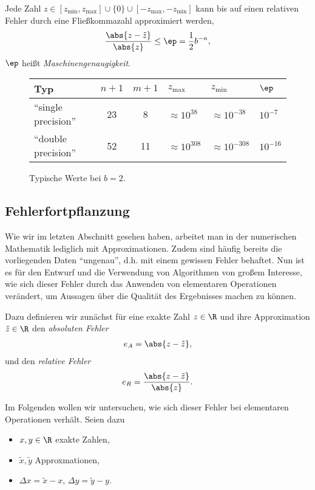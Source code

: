 Jede Zahl $z\in[z_{\text{min}}, z_{\text{max}}]\cup\{0\}\cup[-z_{\text{max}},
-z_{\text{min}}]$ kann bis auf einen relativen Fehler durch eine Fließkommazahl
approximiert werden,
\begin{align*}
\frac{\abs{z-\tilde{z}}}{\abs{z}} \le \ep = \frac{1}{2}b^{-n},
\end{align*}
$\ep$ heißt \emph{Maschinengenaugigkeit}.

\begin{figure}[h]
\begin{tabular}{l|cclll}
\bfseries Typ & $n+1$ & $m+1$ & $z_\text{max}$ & $z_\text{min}$ & $\ep$\\\hline
``single precision'' & 23 & 8 & $\approx 10^{38}$ &  $\approx 10^{-38}$ &
$10^{-7}$\\
``double precision'' & 52 & 11 & $\approx 10^{308}$ &  $\approx 10^{-308}$ &
$10^{-16}$
\end{tabular}
\caption{Typische Werte bei $b=2$.}
\end{figure}

\subsection{Fehlerfortpflanzung}

Wie wir im letzten Abschnitt gesehen haben, arbeitet man in der numerischen
Mathematik lediglich mit Approximationen. Zudem sind häufig bereits die
vorliegenden Daten ``ungenau'', d.h. mit einem gewissen Fehler behaftet. Nun
ist es für den Entwurf und die Verwendung von Algorithmen von großem Interesse,
wie sich dieser Fehler durch das Anwenden von elementaren Operationen
verändert, um Aussagen über die Qualität des Ergebnisses machen zu können.

Dazu definieren wir zunächst für eine exakte Zahl $z\in \R$ und ihre
Approximation $\tilde{z}\in\R$ den \emph{absoluten Fehler}
\begin{align*}
e_A = \abs{z-\tilde{z}},
\end{align*}
und den \emph{relative Fehler}
\begin{align*}
e_R = \frac{\abs{z-\tilde{z}}}{\abs{z}}.
\end{align*}

Im Folgenden wollen wir untersuchen, wie sich dieser Fehler bei elementaren
Operationen verhält. Seien dazu
\begin{itemize}[label=-]
  \item $x,y\in\R$ exakte Zahlen,
  \item $\tilde{x},\tilde{y}$ Approxmationen,
  \item $\Delta x = \tilde{x}-x$, $\Delta y = \tilde{y}-y$.
\end{itemize}

